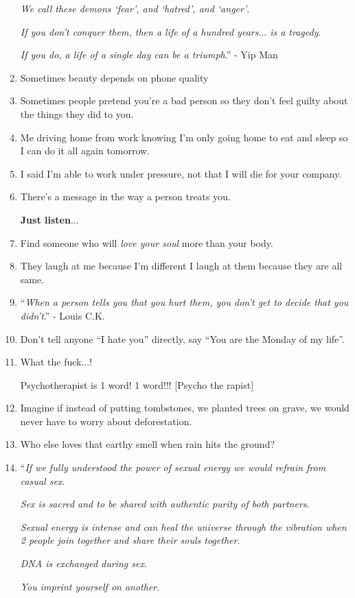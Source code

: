 \documentclass{article}
\begin{document}
\begin{enumerate}
	\textit{We call these demons `fear', and `hatred', and `anger'}.
	
	\textit{If you don't conquer them, then a life of a hundred years$\ldots$ is a tragedy}.
	
	\textit{If you do, a life of a single day can be a triumph}.'' - Yip Man
	\item Sometimes beauty depends on phone quality
	\item Sometimes people pretend you're a bad person so they don't feel guilty about the things they did to you.
	\item Me driving home from work knowing I'm only going home to eat and sleep so I can do it all again tomorrow.
	\item I said I'm able to work under pressure, not that I will die for your company.
	\item There's a message in the way a person treats you.
	
	\textbf{Just listen$\ldots$}
	\item Find someone who will \textit{love your soul} more than your body.
	\item They laugh at me because I'm different I laugh at them because they are all same.
	\item ``\textit{When a person tells you that you hurt them, you don't get to decide that you didn't}.'' - Louis C.K.
	\item Don't tell anyone ``I hate you'' directly, say ``You are the Monday of my life''.
	\item What the fuck$\ldots$!
	
	Psychotherapist is 1 word! 1 word!!! [Psycho the rapist]
	\item Imagine if instead of putting tombstones, we planted trees on grave, we would never have to worry about deforestation.
	\item Who else loves that earthy smell when rain hits the ground?
	\item ``\textit{If we fully understood the power of sexual energy we would refrain from casual sex}.
	
	\textit{Sex is sacred and to be shared with authentic purity of both partners}.
	
	\textit{Sexual energy is intense and can heal the universe through the vibration when 2 people join together and share their souls together}.
	
	\textit{DNA is exchanged during sex}.
	
	\textit{You imprint yourself on another}.
	

\end{enumerate}
\end{document}
